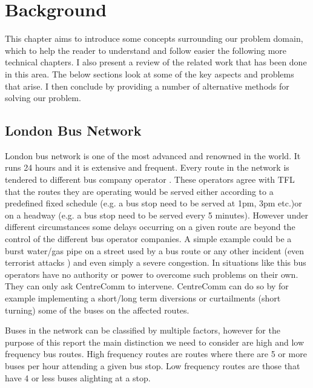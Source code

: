 \chapter{Background}
This chapter aims to introduce some concepts surrounding our problem domain, which to help the reader to understand and follow easier the following more technical chapters. I also present a review of the related work that has been done in this area. The below sections look at some of the key aspects and problems that arise. I then conclude by providing a number of alternative methods for solving our problem.

\section{London Bus Network}
London bus network is one of the most advanced and renowned in the world. It runs 24 hours and it is extensive and frequent. Every route in the network is tendered to different bus company operator \cite{busTendering}. These operators agree with TFL that the routes they are operating would be served either according to a predefined fixed schedule (e.g. a bus stop need to be served at 1pm, 3pm etc.)or on a headway (e.g. a bus stop need to be served every 5 minutes). However under different circumstances some delays occurring on a given route are beyond the control of the different bus operator companies. A simple example could be a burst water/gas pipe on a street used by a bus route or any other incident (even terrorist attacks \cite{centreComm}) and even simply a severe congestion. In situations like this bus operators have no authority or power to overcome such problems on their own. They can only ask CentreComm to intervene. CentreComm can do so by for example implementing a short/long term diversions or curtailments (short turning) some of the buses on the affected routes.

Buses in the network can be classified by multiple factors, however for the purpose of this report the main distinction we need to consider are high and low frequency bus routes. High frequency routes are routes where there are 5 or more buses per hour attending a given bus stop. Low frequency routes are those that have 4 or less buses alighting at a stop.
